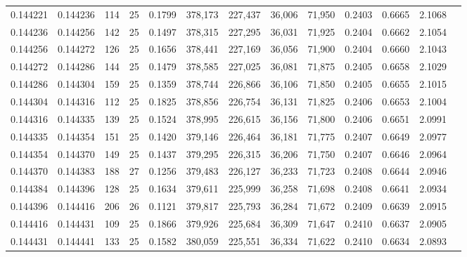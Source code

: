 \begin{tabular}{rrrrrrrrrrrrr}
0.144221 & 0.144236 &   114 &  25 &                                     0.1799 & 378,173 & 227,437 &  36,006 &  71,950 & 0.2403 & 0.6665 & 2.1068 \\
0.144236 & 0.144256 &   142 &  25 &                                     0.1497 & 378,315 & 227,295 &  36,031 &  71,925 & 0.2404 & 0.6662 & 2.1054 \\
0.144256 & 0.144272 &   126 &  25 &                                     0.1656 & 378,441 & 227,169 &  36,056 &  71,900 & 0.2404 & 0.6660 & 2.1043 \\
0.144272 & 0.144286 &   144 &  25 &                                     0.1479 & 378,585 & 227,025 &  36,081 &  71,875 & 0.2405 & 0.6658 & 2.1029 \\
0.144286 & 0.144304 &   159 &  25 &                                     0.1359 & 378,744 & 226,866 &  36,106 &  71,850 & 0.2405 & 0.6655 & 2.1015 \\
0.144304 & 0.144316 &   112 &  25 &                                     0.1825 & 378,856 & 226,754 &  36,131 &  71,825 & 0.2406 & 0.6653 & 2.1004 \\
0.144316 & 0.144335 &   139 &  25 &                                     0.1524 & 378,995 & 226,615 &  36,156 &  71,800 & 0.2406 & 0.6651 & 2.0991 \\
0.144335 & 0.144354 &   151 &  25 &                                     0.1420 & 379,146 & 226,464 &  36,181 &  71,775 & 0.2407 & 0.6649 & 2.0977 \\
0.144354 & 0.144370 &   149 &  25 &                                     0.1437 & 379,295 & 226,315 &  36,206 &  71,750 & 0.2407 & 0.6646 & 2.0964 \\
0.144370 & 0.144383 &   188 &  27 &                                     0.1256 & 379,483 & 226,127 &  36,233 &  71,723 & 0.2408 & 0.6644 & 2.0946 \\
0.144384 & 0.144396 &   128 &  25 &                                     0.1634 & 379,611 & 225,999 &  36,258 &  71,698 & 0.2408 & 0.6641 & 2.0934 \\
0.144396 & 0.144416 &   206 &  26 &                                     0.1121 & 379,817 & 225,793 &  36,284 &  71,672 & 0.2409 & 0.6639 & 2.0915 \\
0.144416 & 0.144431 &   109 &  25 &                                     0.1866 & 379,926 & 225,684 &  36,309 &  71,647 & 0.2410 & 0.6637 & 2.0905 \\
0.144431 & 0.144441 &   133 &  25 &                                     0.1582 & 380,059 & 225,551 &  36,334 &  71,622 & 0.2410 & 0.6634 & 2.0893 \\

\end{tabular}
